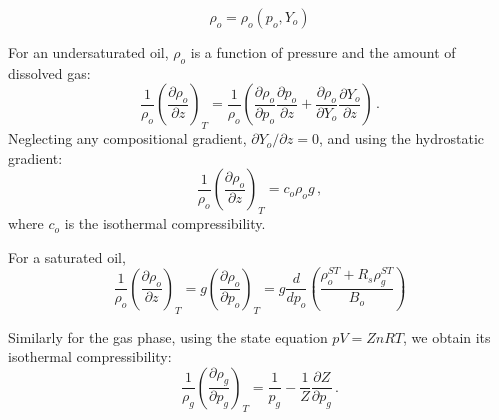 \documentclass[final,authoryear,5p,twocolumn,10pt]{elsarticle}
\begin{document}
%
%
%
%
%
%
%
%
%
\begin{equation}
\rho_o=\rho_o\left(p_o,Y_o\right)
\end{equation}

For an undersaturated oil, $\rho_o$ is a function of pressure and the amount of dissolved gas:
 \begin{equation}
\frac{1}{\rho_o}\left(\frac{\partial \rho_o}{\partial z} \right)_{T} = \frac{1}{\rho_o}\left(\frac{\partial \rho_o}{\partial p_o} \frac{\partial p_o}{\partial z} + \frac{\partial \rho_o}{\partial Y_o}\frac{\partial Y_o}{\partial z}\right) \, . 
 \end{equation}
Neglecting any compositional gradient, $\partial Y_o/\partial z = 0$, and using the hydrostatic gradient:
\begin{equation}
\frac{1}{\rho_o}\left(\frac{\partial \rho_o}{\partial z} \right)_{T} = c_o \rho_o g \, ,
\end{equation}
 where $c_o$ is the isothermal compressibility.

 For a saturated oil,
 \begin{equation}
\frac{1}{\rho_o}\left(\frac{\partial \rho_o}{\partial z} \right)_T = g\left(\frac{\partial \rho_o}{\partial p_o} \right)_T = 
g\frac{d}{d p_o}\left(\frac{\rho_o^{ST}+R_s\rho_g^{ST}}{B_o}\right) 
 \end{equation}


Similarly for the gas phase, using the state equation $pV = Zn R T$, we obtain its isothermal compressibility:
\begin{equation}
\frac{1}{\rho_g}\left(\frac{\partial \rho_g}{\partial p_g}\right)_{T} = \frac{1}{p_g}-\frac{1}{Z}\frac{\partial Z}{\partial p_g} \, .
\end{equation}
\end{document}
